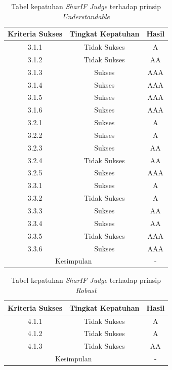 \documentclass[a4paper,twoside]{article}
\begin{document}
\begin{enumerate}
		\begin{table}[H]
			\centering
			\caption{Tabel kepatuhan \textit{SharIF Judge} terhadap prinsip \textit{Understandable}}
			\label{tab:kepatuhan_sharif_judge_understandable}
			\begin{tabular}{|c|c|c|}
				\hline
				Kriteria Sukses & Tingkat Kepatuhan & Hasil \\
				\hline
				3.1.1 & Tidak Sukses & A\\
				3.1.2 & Tidak Sukses & AA\\
				3.1.3 & Sukses & AAA\\
				3.1.4 & Sukses & AAA\\
				3.1.5 & Sukses & AAA\\
				3.1.6 & Sukses & AAA\\
				3.2.1 & Sukses & A\\
				3.2.2 & Sukses & A\\
				3.2.3 & Sukses & AA\\
				3.2.4 & Tidak Sukses & AA\\
				3.2.5 & Sukses & AAA\\
				3.3.1 & Sukses & A\\
				3.3.2 & Tidak Sukses & A\\
				3.3.3 & Sukses & AA\\
				3.3.4 & Sukses & AA\\
				3.3.5 & Tidak Sukses & AAA\\
				3.3.6 & Sukses & AAA\\
				\hline
				\multicolumn{2}{|c|}{Kesimpulan} & - \\
				\hline
			\end{tabular}
		\end{table}
		
		\begin{table}[H]
			\centering
			\caption{Tabel kepatuhan \textit{SharIF Judge} terhadap prinsip \textit{Robust}}
			\label{tab:kepatuhan_sharif_judge_robust}
			\begin{tabular}{|c|c|c|}
				\hline
				Kriteria Sukses & Tingkat Kepatuhan & Hasil \\
				\hline
				4.1.1 & Tidak Sukses & A\\
				4.1.2 & Tidak Sukses & A\\
				4.1.3 & Tidak Sukses & AA\\
				\hline
				\multicolumn{2}{|c|}{Kesimpulan} & - \\
				\hline
			\end{tabular}
		\end{table}
		

\end{enumerate}
\end{document}
